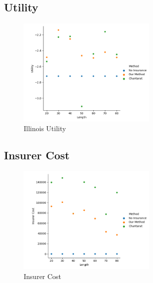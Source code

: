 \documentclass[11pt]{article}
\begin{document}
    \subsection{Utility}
        \begin{figure}[h]
            \centering
            \includegraphics[width=0.6\textwidth]{../../../output/figures/Evaluation 2/Illinois_Utility_Length_ml1.png}
            \caption{Illinois Utility}
        \end{figure}
        \FloatBarrier

    \subsection{Insurer Cost}
        \begin{figure}[h]
            \centering
            \includegraphics[width=0.6\textwidth]{../../../output/figures/Evaluation 2/Illinois_Insurer Cost_Length_ml1.png}
            \caption{Insurer Cost}
        \end{figure}
        \FloatBarrier
\end{document}
